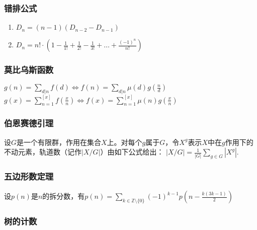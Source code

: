 \documentclass[landscape,twocolumn,a4paper]{article}
\begin{document}
	\subsubsection*{错排公式}

	\begin{enumerate}
		\item $D_n = (n-1)(D_{n-2}-D_{n-1})$
		\item $D_n = n! \cdot (1-\frac{1}{1!}+\frac{1}{2!}-\frac{1}{3!}+\ldots+\frac{(-1)^n}{n!})$
	\end{enumerate}

	\subsubsection*{莫比乌斯函数}
	\iffalse
	$\mu(n) = \begin{cases}
	1 & \text{若}n=1\\
	(-1)^k & \text{若}n\text{无平方数因子，且}n = p_1p_2\dots p_k\\
	0 & \text{若}n\text{有大于}1\text{的平方数因数}
	\end{cases}$
	$\sum_{d|n}{\mu(d)} = \begin{cases}
	1 & \text{若}n=1\\
	0 & \text{其他情况}
	\end{cases}$
	\fi
	$g(n) = \sum_{d|n}{f(d)} \Leftrightarrow f(n) = \sum_{d|n}{\mu(d)g(\frac{n}{d})}$
	$g(x) = \sum_{n=1}^{[x]}f(\frac{x}{n}) \Leftrightarrow f(x) = \sum_{n=1}^{[x]}{\mu(n)g(\frac{x}{n})}$

	\subsubsection*{伯恩赛德引理}
	设$G$是一个有限群，作用在集合$X$上。对每个$g$属于$G$，令$X^g$表示$X$中在$g$作用下的不动元素，轨道数（记作$|X/G|$）由如下公式给出：
	$|X/G| = \frac{1}{|G|}\sum_{g \in G}|X^g|.\,$

	\subsubsection*{五边形数定理}

	设$p(n)$是$n$的拆分数，有$p(n) = \sum_{k \in \mathbb{Z} \setminus \{0\}} (-1)^{k - 1} p\left(n - \frac{k(3k - 1)}{2}\right)$

	\subsubsection*{树的计数}
\end{document}
